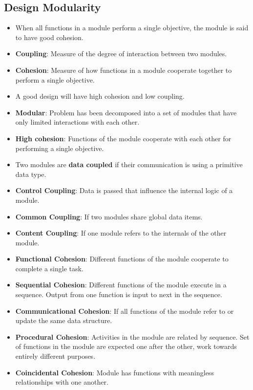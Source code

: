 \documentclass[a4paper]{article}
\begin{document}
\subsection{Design Modularity}
\begin{itemize}
    \item When all functions in a module perform a single objective, the module is said to have good cohesion.
    \item \textbf{Coupling}: Measure of the degree of interaction between two modules.
    \item \textbf{Cohesion}: Measure of how functions in a module cooperate together to perform a single objective.
    \item A good design will have high cohesion and low coupling.
    \item \textbf{Modular}: Problem has been decomposed into a set of modules that have only limited interactions with each other.
    \item \textbf{High cohesion}: Functions of the module cooperate with each other for performing a single objective.
    \item Two modules are \textbf{data coupled} if their communication is using a primitive data type.
    \item \textbf{Control Coupling}: Data is passed that influence the internal logic of a module.
    \item \textbf{Common Coupling}: If two modules share global data items.
    \item \textbf{Content Coupling}: If one module refers to the internals of the other module.
    \item \textbf{Functional Cohesion}: Different functions of the module cooperate to complete a single task.
    \item \textbf{Sequential Cohesion}: Different functions of the module execute in a sequence. Output from one function is input to next in the sequence.
    \item \textbf{Communicational Cohesion}: If all functions of the module refer to or update the same data structure.
    \item \textbf{Procedural Cohesion}: Activities in the module are related by sequence. Set of functions in the module are expected one after the other, work towards entirely different purposes.
    \item \textbf{Coincidental Cohesion}: Module has functions with meaningless relationships with one another.
\end{itemize}
\end{document}
